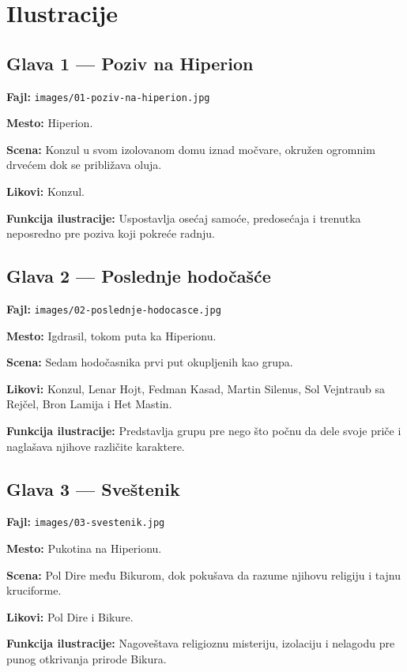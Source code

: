 \chapter*{Ilustracije}

\section*{Glava 1 — Poziv na Hiperion}

\textbf{Fajl:} \texttt{images/01-poziv-na-hiperion.jpg}

\textbf{Mesto:} Hiperion.

\textbf{Scena:} Konzul u svom izolovanom domu iznad močvare, okružen ogromnim drvećem dok se približava oluja.

\textbf{Likovi:} Konzul.

\textbf{Funkcija ilustracije:} Uspostavlja osećaj samoće, predosećaja i trenutka neposredno pre poziva koji pokreće radnju.

\section*{Glava 2 — Poslednje hodočašće}

\textbf{Fajl:} \texttt{images/02-poslednje-hodocasce.jpg}

\textbf{Mesto:} Igdrasil, tokom puta ka Hiperionu.

\textbf{Scena:} Sedam hodočasnika prvi put okupljenih kao grupa.

\textbf{Likovi:} Konzul, Lenar Hojt, Fedman Kasad, Martin Silenus, Sol Vejntraub sa Rejčel, Bron Lamija i Het Mastin.

\textbf{Funkcija ilustracije:} Predstavlja grupu pre nego što počnu da dele svoje priče i naglašava njihove različite karaktere.

\section*{Glava 3 — Sveštenik}

\textbf{Fajl:} \texttt{images/03-svestenik.jpg}

\textbf{Mesto:} Pukotina na Hiperionu.

\textbf{Scena:} Pol Dire među Bikurom, dok pokušava da razume njihovu religiju i tajnu kruciforme.

\textbf{Likovi:} Pol Dire i Bikure.

\textbf{Funkcija ilustracije:} Nagoveštava religioznu misteriju, izolaciju i nelagodu pre punog otkrivanja prirode Bikura.

